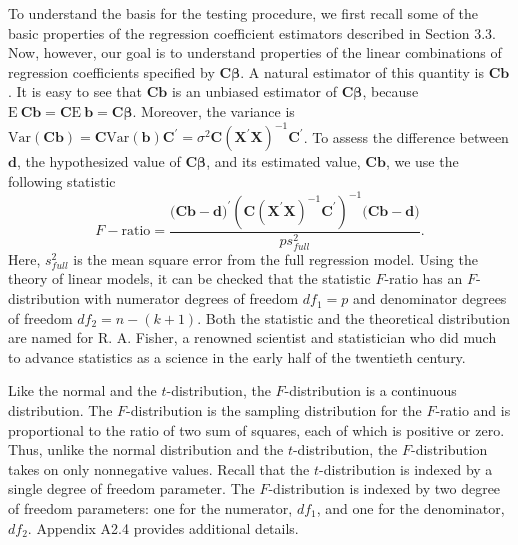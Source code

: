 To understand the basis for the testing procedure, we first recall
some of the basic properties of the regression coefficient
estimators described in Section 3.3. Now, however, our goal is to
understand properties of the linear combinations of regression
coefficients specified by $\mathbf{C\boldsymbol \beta } $. A natural
estimator of this quantity is $\mathbf{Cb}$. It is easy to see that
$\mathbf{Cb}$ is an unbiased estimator of $\mathbf{C\boldsymbol
\beta }$, because $
\mathrm{E~}\mathbf{Cb=C}\mathrm{E~}\mathbf{b=C\boldsymbol \beta }$.
Moreover, the
variance is $\mathrm{Var}\left( \mathbf{Cb}\right) \mathbf{=C}\mathrm{Var}%
\left( \mathbf{b}\right) \mathbf{C}^{\prime}=\sigma
^2\mathbf{C}\left( \mathbf{X^{\prime}X}\right)
^{-1}\mathbf{C}^{\prime}$. To assess the difference between
$\mathbf{d}$, the hypothesized value of $\mathbf{C \boldsymbol \beta
}$, and its estimated value, $\mathbf{Cb}$, we use the following
statistic
\begin{equation}\label{E4:GenLinHypF-ratio}
F-\textrm{ratio}=\frac{(\mathbf{Cb-d)}^{\prime}\left(
\mathbf{C}\left( \mathbf{X^{\prime}X} \right)
^{-1}\mathbf{C}^{\prime}\right) ^{-1}(\mathbf{Cb-d)}}{ps_{full}^2}.
\end{equation}
Here, $s_{full}^2$ is the mean square error from the full regression
model. Using the theory of linear models, it can be checked that the
statistic $F$-ratio has an $F$-distribution with numerator degrees
of freedom $df_1=p$ and denominator degrees of freedom
$df_2=n-(k+1)$. Both the statistic and the theoretical distribution
are named for R. A. Fisher, a renowned scientist and statistician
who did much to advance statistics as a science in the early half of
the twentieth century.

Like the normal and the $t$-distribution, the $F$-distribution is a
continuous distribution. The $F$-distribution is the sampling
distribution for the $F$-ratio and is proportional to the ratio of
two sum of squares, each of which is positive or zero. Thus, unlike
the normal distribution and the $t$-distribution, the
$F$-distribution takes on only nonnegative values. Recall that the
$t$-distribution is indexed by a single degree of freedom parameter.
The $F$-distribution is indexed by two degree of freedom
parameters: one for the numerator, $df_1$, and one for the denominator, $%
df_2$. Appendix A2.4 provides additional details.


